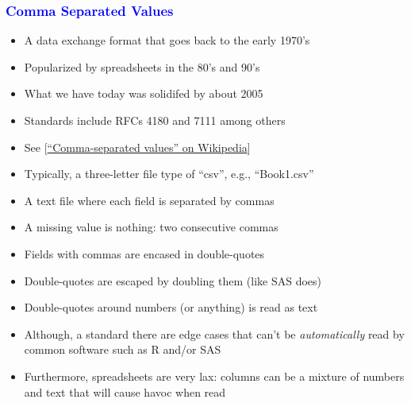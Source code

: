 \documentclass[11pt,pdftex,dvipsnames,usenames]{beamer}
\begin{document}
\begin{frame}[fragile]\frametitle{\bf\textcolor{blue}{Comma Separated Values}}

\begin{itemize}
\item A data exchange format that goes back to the early 1970's
\item Popularized by spreadsheets in the 80's and 90's
\item What we have today was solidifed by about 2005 
\item Standards include RFCs 4180 and 7111 among others
\item See \textcolor{PineGreen}{[\href{https://en.wikipedia.org/wiki/Comma-separated_values}
{``Comma-separated values'' on Wikipedia}]}
\item Typically, a three-letter file type of ``csv'',
e.g., ``Book1.csv''
\item A text file where each field is separated by commas
\item A missing value is nothing: two consecutive commas
\item Fields with commas are encased in double-quotes
\item Double-quotes are escaped by doubling them (like SAS does)
\item Double-quotes around numbers (or anything) is read as text 
\item Although, a standard there are edge cases that can't be
  {\it automatically} read by common software such as R and/or SAS
\item Furthermore, spreadsheets are very lax: columns can be a mixture of numbers and text that will cause havoc when read
\end{itemize}

\end{frame}
\end{document}
